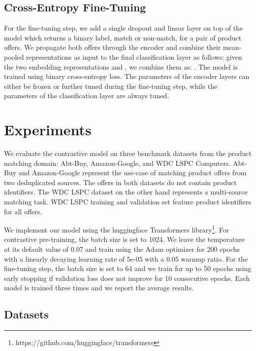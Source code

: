 \documentclass[sigconf]{acmart}
\begin{document}
\subsection{Cross-Entropy Fine-Tuning}
\label{subsec:finetunestep}

For the fine-tuning step, we add a single dropout and linear layer on top of the model which returns a binary label, match or non-match, for a pair of product offers. We propagate both offers through the encoder and combine their mean-pooled representations as input to the final classification layer as follows: given the two embedding representations  and , we combine them as: . The model is trained using binary cross-entropy loss. The parameters of the encoder layers can either be frozen or further tuned during the fine-tuning step, while the parameters of the classification layer are always tuned.

\section{Experiments}
\label{sec:experiments}
We evaluate the contrastive model on three benchmark datasets from the product matching domain: Abt-Buy, Amazon-Google, and WDC LSPC Computers. Abt-Buy and Amazon-Google represent the use-case of matching product offers from two deduplicated sources. The offers in both datasets do not contain product identifiers. The WDC LSPC dataset on the other hand represents a multi-source matching task. WDC LSPC training and validation set feature product identifiers for all offers. 

We implement our model using the huggingface Transformers library\footnote{https://github.com/huggingface/transformers}. For contrastive pre-training, the batch size is set to 1024. We leave the temperature at its default value of 0.07 and train using the Adam optimizer for 200 epochs with a linearly decaying learning rate of 5e-05 with a 0.05 warmup ratio. For the fine-tuning step, the batch size is set to 64 and we train for up to 50 epochs using early stopping if validation loss does not improve for 10 consecutive epochs. Each model is trained three times and we report the average results.

\subsection{Datasets}
\label{subsec:datasets}
\end{document}

